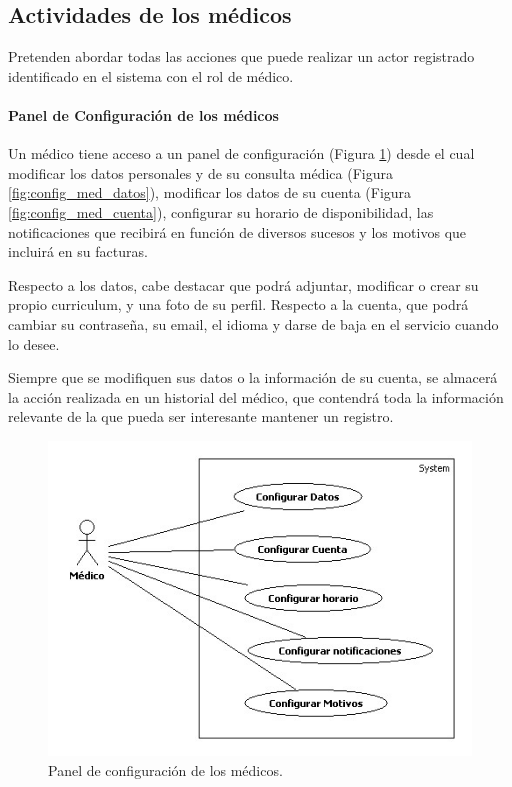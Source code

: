 

			\subsection{Actividades de los médicos} %
			\label{sec:actividades_de_los_medicos}

				Pretenden abordar todas las acciones que puede realizar un actor registrado identificado en el sistema con el rol de médico.
				\paragraph{Panel de Configuración de los médicos} %
				\label{par:panel_de_configuracion_de_los_medicos}
					Un médico tiene acceso a un panel de configuración (Figura \ref{fig:config_med}) desde el cual modificar los datos personales y de su consulta médica (Figura \ref{fig:config_med_datos}), modificar los datos de su cuenta (Figura \ref{fig:config_med_cuenta}), configurar su horario de disponibilidad, las notificaciones que recibirá en función de diversos sucesos y los motivos que incluirá en su facturas.

					Respecto a los datos, cabe destacar que podrá adjuntar, modificar o crear su propio curriculum, y una foto de su perfil. Respecto a la cuenta, que podrá cambiar su contraseña, su email, el idioma y darse de baja en el servicio cuando lo desee.

					Siempre que se modifiquen sus datos o la información de su cuenta, se almacerá la acción realizada en un historial del médico, que contendrá toda la información relevante de la que pueda ser interesante mantener un registro.
					\begin{figure}[H]
					  \centering
					    \includegraphics[width=12cm]{img/jpg/casos_uso/Configuracion_Medico.jpg}
					  \caption{Panel de configuración de los médicos.}
					  \label{fig:config_med}
					\end{figure}

